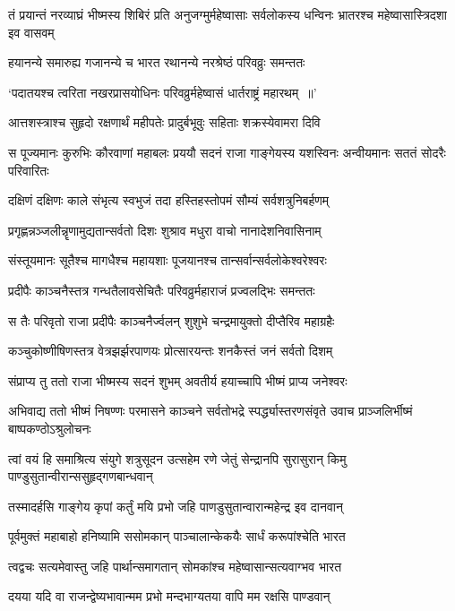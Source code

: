 \threelineshloka
{तं प्रयान्तं नरव्याघ्रं भीष्मस्य शिबिरं प्रति}
{अनुजग्मुर्महेष्वासाः सर्वलोकस्य धन्विनः}
{भ्रातरश्च महेष्वासास्त्रिदशा इव वासवम्}


\twolineshloka
{हयानन्ये समारुह्य गजानन्ये च भारत}
{रथानन्ये नरश्रेष्ठं परिवव्रुः समन्ततः}


\twolineshloka
{`पदातयश्च त्वरिता नखरप्रासयोधिनः}
{परिवव्रुर्महेष्वासं धार्तराष्ट्रं महारथम् ॥'}


\twolineshloka
{आत्तशस्त्राश्च सुहृदो रक्षणार्थं महीपतेः}
{प्रादुर्बभूवुः सहिताः शक्रस्येवामरा दिवि}


\threelineshloka
{स पूज्यमानः कुरुभिः कौरवाणां महाबलः}
{प्रययौ सदनं राजा गाङ्गेयस्य यशस्विनः}
{अन्वीयमानः सततं सोदरैः परिवारितः}


\twolineshloka
{दक्षिणं दक्षिणः काले संभृत्य स्वभुजं तदा}
{हस्तिहस्तोपमं सौम्यं सर्वशत्रुनिबर्हणम्}


\twolineshloka
{प्रगृह्णन्नञ्जलीन्नॄणामुद्यतान्सर्वतो दिशः}
{शुश्राव मधुरा वाचो नानादेशनिवासिनाम्}


\twolineshloka
{संस्तूयमानः सूतैश्च मागधैश्च महायशाः}
{पूजयानश्च तान्सर्वान्सर्वलोकेश्वरेश्वरः}


\twolineshloka
{प्रदीपैः काञ्चनैस्तत्र गन्धतैलावसेचितैः}
{परिवव्रुर्महाराजं प्रज्वलद्भिः समन्ततः}


\twolineshloka
{स तैः परिवृतो राजा प्रदीपैः काञ्चनैर्ज्वलन्}
{शुशुभे चन्द्रमायुक्तो दीप्तैरिव महाग्रहैः}


\twolineshloka
{कञ्चुकोष्णीषिणस्तत्र वेत्रझर्झरपाणयः}
{प्रोत्सारयन्तः शनकैस्तं जनं सर्वतो दिशम्}


\twolineshloka
{संप्राप्य तु ततो राजा भीष्मस्य सदनं शुभम्}
{अवतीर्य हयाच्चापि भीष्मं प्राप्य जनेश्वरः}


\threelineshloka
{अभिवाद्य ततो भीष्मं निषण्णः परमासने}
{काञ्चने सर्वतोभद्रे स्पर्द्ध्यास्तरणसंवृते}
{उवाच प्राञ्जलिर्भीष्मं बाष्पकण्ठोऽश्रुलोचनः}


\threelineshloka
{त्वां वयं हि समाश्रित्य संयुगे शत्रुसूदन}
{उत्सहेम रणे जेतुं सेन्द्रानपि सुरासुरान्}
{किमु पाण्डुसुतान्वीरान्ससुहृद्गणबान्धवान्}


\twolineshloka
{तस्मादर्हसि गाङ्गेय कृपां कर्तुं मयि प्रभो}
{जहि पाणडुसुतान्वारान्महेन्द्र इव दानवान्}


\twolineshloka
{पूर्वमुक्तं महाबाहो हनिष्यामि ससोमकान्}
{पाञ्चालान्केकयैः सार्धं करूपांश्चेति भारत}


\twolineshloka
{त्वद्वचः सत्यमेवास्तु जहि पार्थान्समागतान्}
{सोमकांश्च महेष्वासान्सत्यवाग्भव भारत}


\twolineshloka
{दयया यदि वा राजन्द्वेष्यभावान्मम प्रभो}
{मन्दभाग्यतया वापि मम रक्षसि पाण्डवान्}


